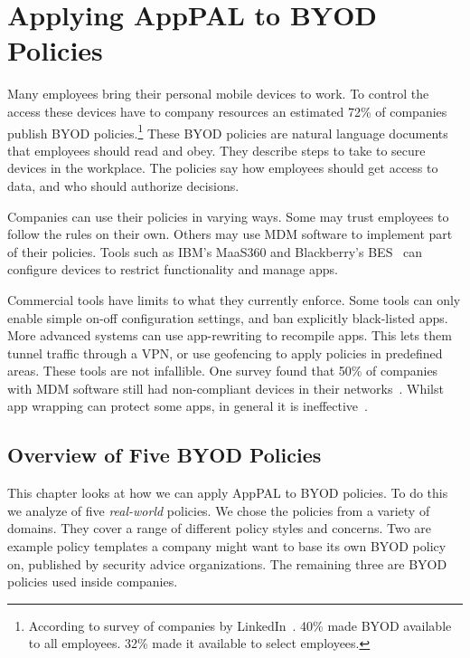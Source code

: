 \documentclass[thesis.tex]{subfiles}
\begin{document}
\chapter{Applying AppPAL to BYOD Policies}
\label{chap:byod}

Many employees bring their personal mobile devices to work. To control
the access these devices have to company resources an estimated 72\%
of companies publish \ac{BYOD} policies.\footnote{According to survey
  of companies by LinkedIn~\cite{schulze_byod_2016}. 40\% made \ac{BYOD}
  available to all employees. 32\% made it available to select
  employees.} These \ac{BYOD} policies are natural language documents
that employees should read and obey. They describe steps to take to
secure devices in the workplace. The policies say how employees should
get access to data, and who should authorize decisions.

Companies can use their policies in varying ways. Some may
trust employees to follow the rules on their own. Others may use
\ac{MDM} software to implement part of their policies. Tools such as
IBM's MaaS360 and Blackberry's BES~\cite{ibm_ibm_nodate,blackberry_secure_nodate} can
configure devices to restrict functionality and manage apps.

Commercial tools have limits to what they currently enforce. Some
tools can only enable simple on-off configuration settings, and ban
explicitly black-listed apps. More advanced systems can use
app-rewriting to recompile apps. This lets them tunnel traffic through a VPN, or use
geofencing to apply policies in predefined areas. These tools are not
infallible. One survey found that 50\% of companies with \ac{MDM}
software still had non-compliant devices in their
networks~\cite{mobileiron_security_labs_q4_2015}. Whilst app wrapping
can protect some apps, in general it is
ineffective~\cite{hao_effectiveness_2013}.

\section{Overview of Five BYOD Policies}
\label{sec:overview-of-five-byod-policies}

This chapter looks at how we can apply AppPAL to
BYOD policies.  To do this we analyze of five \emph{real-world} policies.
We chose the policies from a variety of domains.  They cover a range
of different policy styles and concerns.  Two are example policy
templates a company might want to base its own BYOD policy on,
published by security advice organizations.  The remaining three are
BYOD policies used inside companies.
\end{document}
